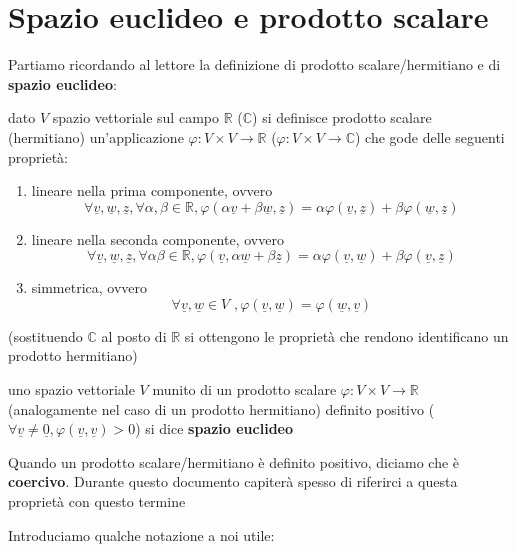 	\section{Spazio euclideo e prodotto scalare}
	Partiamo ricordando al lettore la definizione di prodotto scalare/hermitiano e di \textbf{spazio euclideo}:
	\begin{definition}
	dato $V$ spazio vettoriale sul campo $\mathbb{R}$ ($\mathbb{C}$) si definisce prodotto scalare (hermitiano) un'applicazione $\varphi: V \times V \to \mathbb{R}$ ($\varphi: V \times V \to \mathbb{C}$) che gode delle seguenti proprietà:
	\begin{enumerate}[label=\protect\circled{\arabic*}]
		\item lineare nella prima componente, ovvero
		$$
		\forall \underline{v}, \underline{w}, \underline{z}, \forall \alpha, \beta \in \mathbb{R}, \varphi(\alpha \underline{v} + \beta \underline{w}, \underline{z}) = \alpha \varphi(\underline{v}, \underline{z}) + \beta \varphi(\underline{w}, \underline{z})
		$$
		\item lineare nella seconda componente, ovvero
		$$
		\forall \underline{v}, \underline{w}, \underline{z}, \forall \alpha \beta \in \mathbb{R}, \varphi(\underline{v}, \alpha \underline{w} + \beta \underline{z}) = \alpha \varphi(\underline{v}, \underline{w}) + \beta \varphi(\underline{v}, \underline{z})
		$$
		\item simmetrica, ovvero
		$$
		\forall \underline{v}, \underline{w} \in V \, \, , \varphi(\underline{v}, \underline{w}) = \varphi(\underline{w}, \underline{v})
		$$
	\end{enumerate}
	(sostituendo $\mathbb{C}$ al posto di $\mathbb{R}$ si ottengono le proprietà che rendono identificano un prodotto hermitiano)
	\end{definition}
	\begin{definition}
		uno spazio vettoriale $V$ munito di un prodotto scalare $\varphi: V \times V \to \mathbb{R}$ (analogamente nel caso di un prodotto hermitiano) definito positivo ($\forall \underline{v} \neq \underline{0}, \varphi(\underline{v}, \underline{v}) > 0$) si dice \textbf{spazio euclideo}
	\end{definition}
	\begin{remark}
	Quando un prodotto scalare/hermitiano è definito positivo, diciamo che è \textbf{coercivo}. Durante questo documento capiterà spesso di riferirci a questa proprietà con questo termine
	\end{remark}
	\noindent Introduciamo qualche notazione a noi utile:
